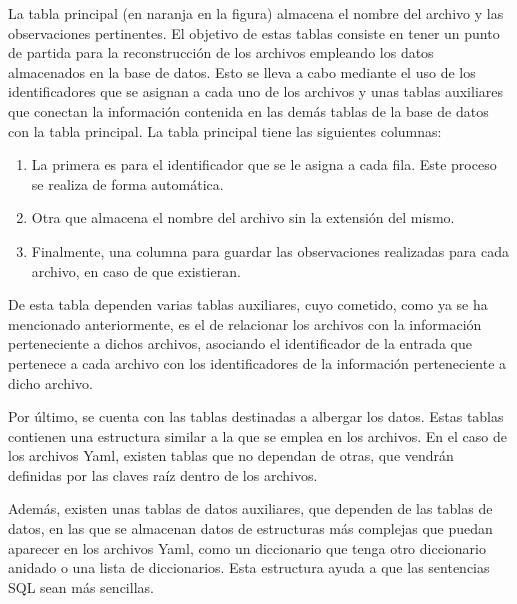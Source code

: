 La tabla principal (en naranja en la figura) almacena el nombre del archivo y las observaciones pertinentes. El objetivo de estas tablas consiste en tener un punto de partida para la reconstrucción de los archivos empleando los datos almacenados en la base de datos. Esto se lleva a cabo mediante el uso de los identificadores que se asignan a cada uno de los archivos y unas tablas auxiliares que conectan la información contenida en las demás tablas de la base de datos con la tabla principal. La tabla principal tiene las siguientes columnas: %
\begin{enumerate}
    \item La primera es para el identificador que se le asigna a cada fila. Este proceso se realiza de forma automática.
    \item Otra que almacena el nombre del archivo sin la extensión del mismo.
    \item Finalmente, una columna para guardar las observaciones realizadas para cada archivo, en caso de que existieran.
\end{enumerate}

De esta tabla dependen varias tablas auxiliares, cuyo cometido, como ya se ha mencionado anteriormente, es el de relacionar los archivos con la información perteneciente a dichos archivos, asociando el identificador de la entrada que pertenece a cada archivo con los identificadores de la información perteneciente a dicho archivo. 

Por último, se cuenta con las tablas destinadas a albergar los datos. Estas tablas contienen una estructura similar a la que se emplea en los archivos. En el caso de los archivos \acrshort{Yaml}, existen tablas que no dependan de otras, que vendrán definidas por las claves raíz dentro de los archivos.


Además, existen unas tablas de datos auxiliares, que dependen de las tablas de datos, en las que se almacenan datos de estructuras más complejas que puedan aparecer en los archivos \acrshort{Yaml}, como un diccionario que tenga otro diccionario anidado o una lista de diccionarios. Esta estructura ayuda a que las sentencias \acrshort{SQL} sean más sencillas.

